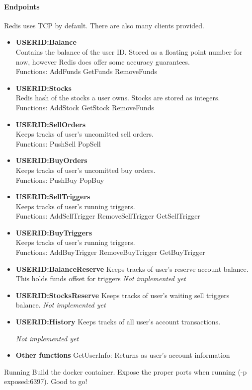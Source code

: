 \documentclass[a4paper,10pt]{article}
\begin{document}
\paragraph{Endpoints}

Redis uses TCP by default. There are also many clients provided.

\begin{itemize}
\item \textbf{USERID:Balance}
\\Contains the balance of the user ID. Stored as a floating point number for 
now, however Redis does offer some accuracy guarantees.
\\Functions:
   AddFunds
   GetFunds
   RemoveFunds

\item \textbf{USERID:Stocks}
\\Redis hash of the stocks a user owns. Stocks are stored as integers.
\\Functions:
  AddStock
  GetStock
  RemoveFunds

\item \textbf{USERID:SellOrders}
\\Keeps tracks of user's uncomitted sell orders.
\\Functions:
  PushSell
  PopSell

\item \textbf{USERID:BuyOrders}
\\Keeps tracks of user's uncomitted buy orders.
\\Functions:
  PushBuy
  PopBuy

\item \textbf{USERID:SellTriggers}
\\Keeps tracks of user's running triggers.
\\Functions:
  AddSellTrigger
  RemoveSellTrigger
  GetSellTrigger
 
\item \textbf{USERID:BuyTriggers}
\\Keeps tracks of user's running triggers.
\\Functions:
  AddBuyTrigger
  RemoveBuyTrigger
  GetBuyTrigger
  
\item \textbf{USERID:BalanceReserve}
Keeps tracks of user's reserve account balance. This holds funds offset for 
triggers
\textit{Not implemented yet}

\item \textbf{USERID:StocksReserve}
Keeps tracks of user's waiting sell triggers balance.
\textit{Not implemented yet}

\item \textbf{USERID:History}
Keeps tracks of all user's account transactions.

\textit{Not implemented yet}

\item \textbf{Other functions}
  GetUserInfo: Returns as user's account information
\end{itemize}
Running
  Build the docker container.  Expose the proper ports when running (-p 
exposed:6397).  Good to go!
\end{document}
